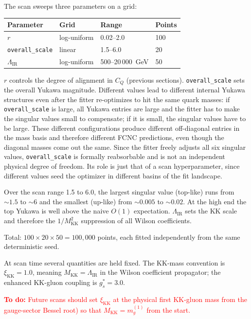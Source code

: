\documentclass[11pt]{article}
\newcommand{\Mkk}{M_{\mathrm{KK}}}
\newcommand{\LamIR}{\Lambda_{\mathrm{IR}}}
\newcommand{\gs}{g_s^*}
\begin{document}
The scan sweeps three parameters on a grid:

\begin{center}
\begin{tabular}{@{}llll@{}}
\toprule
Parameter & Grid & Range & Points \\
\midrule
$r$ & log-uniform & 0.02--2.0 & 100 \\
\texttt{overall\_scale} & linear & 1.5--6.0 & 20 \\
$\LamIR$ & log-uniform & 500--20\,000~GeV & 50 \\
\bottomrule
\end{tabular}
\end{center}

$r$ controls the degree of alignment in $C_Q$ (previous sections).
\texttt{overall\_scale} sets the overall Yukawa magnitude. Different values
lead to different internal Yukawa structures even after the fitter re-optimizes
to hit the same quark masses: if \texttt{overall\_scale} is large, all Yukawa
entries are large and the fitter has to make the singular values small to
compensate; if it is small, the singular values have to be large. These
different configurations produce different off-diagonal entries in the mass
basis and therefore different FCNC predictions, even though the diagonal masses
come out the same. Since the fitter freely adjusts all
six singular values, \texttt{overall\_scale} is formally reabsorbable and is
not an independent physical degree of freedom. Its role is just that of a scan hyperparameter, since different values seed the optimizer in
different basins of the fit landscape.


Over the scan range 1.5 to 6.0, the largest singular value
(top-like) runs from $\sim 1.5$ to $\sim 6$ and the smallest (up-like) from
$\sim 0.005$ to $\sim 0.02$. At the high end the top Yukawa is well above the
naive $O(1)$ expectation. $\LamIR$ sets the KK scale and therefore the
$1/\Mkk^2$ suppression of all Wilson coefficients.

Total: $100 \times 20 \times 50 = 100{,}000$ points, each fitted independently
from the same deterministic seed.

At scan time several quantities are held fixed. The KK-mass convention is
$\xi_{\mathrm{KK}} = 1.0$, meaning $\Mkk = \LamIR$ in the Wilson coefficient
propagator; the enhanced
KK-gluon coupling is $\gs = 3.0$.

\textcolor{red}{\textbf{To do:} Future scans should set
$\xi_{\mathrm{KK}}$ at the physical first KK-gluon mass from the
gauge-sector Bessel root) so that $\Mkk = m_g^{(1)}$ from the start.}
\end{document}
